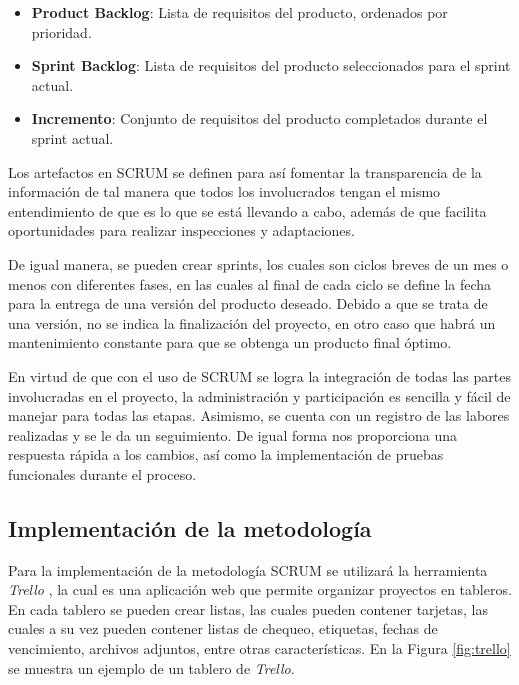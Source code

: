 \begin{itemize}
  \item \textbf{Product Backlog}: Lista de requisitos del producto, ordenados
  por prioridad.
  \item \textbf{Sprint Backlog}: Lista de requisitos del producto seleccionados
  para el sprint actual.
  \item \textbf{Incremento}: Conjunto de requisitos del producto completados
  durante el sprint actual.
\end{itemize}

Los artefactos en SCRUM se definen para así fomentar la transparencia de la
información de tal manera que todos los involucrados tengan el mismo entendimiento
de que es lo que se está llevando a cabo, además de que facilita oportunidades
para realizar inspecciones y adaptaciones.

De igual manera, se pueden crear sprints, los cuales son ciclos breves de un mes
o menos con diferentes fases, en las cuales al final de cada ciclo se define la
fecha para la entrega de una versión del producto deseado. Debido a que se trata
de una versión, no se indica la finalización del proyecto, en otro caso que habrá
un mantenimiento constante para que se obtenga un producto final óptimo.

En virtud de que con el uso de SCRUM se logra la integración de todas las partes
involucradas en el proyecto, la administración y participación es sencilla y
fácil de manejar para todas las etapas. Asimismo, se cuenta con un registro de
las labores realizadas y se le da un seguimiento. De igual forma nos proporciona
una respuesta rápida a los cambios, así como la implementación de pruebas
funcionales durante el proceso.

\subsection{Implementación de la metodología}

Para la implementación de la metodología SCRUM se utilizará la herramienta
\textit{Trello} \cite{trello2023}, la cual es una aplicación web que permite
organizar proyectos en tableros. En cada tablero se pueden crear listas, las
cuales pueden contener tarjetas, las cuales a su vez pueden contener listas de
chequeo, etiquetas, fechas de vencimiento, archivos adjuntos, entre otras
características. En la Figura \ref{fig:trello} se muestra un ejemplo de un
tablero de \textit{Trello}.

